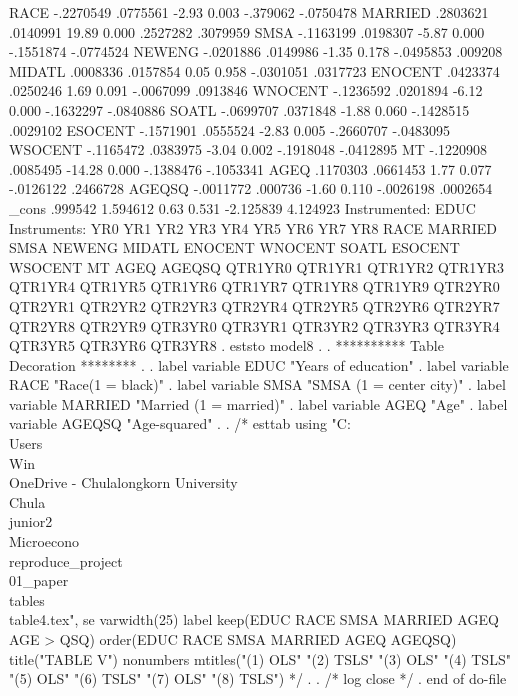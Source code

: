         RACE {\VBAR}  -.2270549   .0775561    -2.93   0.003     -.379062   -.0750478
     MARRIED {\VBAR}   .2803621   .0140991    19.89   0.000     .2527282    .3079959
        SMSA {\VBAR}  -.1163199   .0198307    -5.87   0.000    -.1551874   -.0774524
      NEWENG {\VBAR}  -.0201886   .0149986    -1.35   0.178    -.0495853     .009208
      MIDATL {\VBAR}   .0008336   .0157854     0.05   0.958    -.0301051    .0317723
     ENOCENT {\VBAR}   .0423374   .0250246     1.69   0.091    -.0067099    .0913846
     WNOCENT {\VBAR}  -.1236592   .0201894    -6.12   0.000    -.1632297   -.0840886
       SOATL {\VBAR}  -.0699707   .0371848    -1.88   0.060    -.1428515    .0029102
     ESOCENT {\VBAR}  -.1571901   .0555524    -2.83   0.005    -.2660707   -.0483095
     WSOCENT {\VBAR}  -.1165472   .0383975    -3.04   0.002    -.1918048   -.0412895
          MT {\VBAR}  -.1220908   .0085495   -14.28   0.000    -.1388476   -.1053341
        AGEQ {\VBAR}   .1170303   .0661453     1.77   0.077    -.0126122    .2466728
      AGEQSQ {\VBAR}  -.0011772    .000736    -1.60   0.110    -.0026198    .0002654
       _cons {\VBAR}    .999542   1.594612     0.63   0.531    -2.125839    4.124923
Instrumented:  EDUC
Instruments:   YR0 YR1 YR2 YR3 YR4 YR5 YR6 YR7 YR8 RACE MARRIED SMSA NEWENG
               MIDATL ENOCENT WNOCENT SOATL ESOCENT WSOCENT MT AGEQ AGEQSQ
               QTR1YR0 QTR1YR1 QTR1YR2 QTR1YR3 QTR1YR4 QTR1YR5 QTR1YR6
               QTR1YR7 QTR1YR8 QTR1YR9 QTR2YR0 QTR2YR1 QTR2YR2 QTR2YR3
               QTR2YR4 QTR2YR5 QTR2YR6 QTR2YR7 QTR2YR8 QTR2YR9 QTR3YR0
               QTR3YR1 QTR3YR2 QTR3YR3 QTR3YR4 QTR3YR5 QTR3YR6 QTR3YR8
{\smallskip}
. eststo model8
{\smallskip}
. 
. **********  Table Decoration ********
. 
. label variable EDUC   "Years of education"
{\smallskip}
. label variable RACE   "Race(1 = black)"
{\smallskip}
. label variable SMSA   "SMSA (1 = center city)"
{\smallskip}
. label variable MARRIED   "Married (1 = married)"
{\smallskip}
. label variable AGEQ   "Age"
{\smallskip}
. label variable AGEQSQ   "Age-squared"
{\smallskip}
. 
. /* esttab using "C:\\Users\\Win\\OneDrive - Chulalongkorn University\\Chula\\junior2\\Microecono\\reproduce_project\\01_paper\\tables\\table4.tex", se varwidth(25) label keep(EDUC RACE SMSA MARRIED AGEQ AGE
> QSQ) order(EDUC RACE SMSA MARRIED AGEQ AGEQSQ) title("TABLE V") nonumbers mtitles("(1) OLS" "(2) TSLS" "(3) OLS" "(4) TSLS" "(5) OLS" "(6) TSLS" "(7) OLS" "(8) TSLS") */
. 
. /* log close */
. 
end of do-file
{\smallskip}
